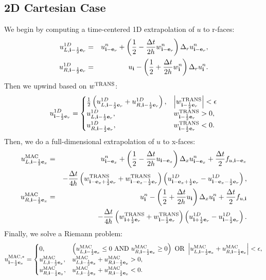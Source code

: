 \documentclass[11pt]{article}
\def\half  {\frac{1}{2}}
\def\dt    {\Delta t}
\def\mac   {\rm MAC}
\def\trans {\rm TRANS}
\def\eb    {{\bf e}}
\def\ib    {{\bf i}}
\begin{document}
\subsection{2D Cartesian Case}
We begin by computing a time-centered 1D extrapolation of $u$ to r-faces:
\begin{eqnarray}
u_{L,\ib-\half\eb_r}^{1D} &=& u_{\ib-\eb_r}^n + \left(\half - \frac{\dt}{2h}w_{\ib-\eb_r}^n\right)\Delta_r u_{\ib-\eb_r}^n, \\
u_{R,\ib-\half\eb_r}^{1D} &=& u_{\ib} - \left(\half + \frac{\dt}{2h}w_{\ib}^n\right)\Delta_r u_{\ib}^n.
\end{eqnarray}
Then we upwind based on $w^{\trans}$:
\begin{equation}
u_{\ib-\half\eb_r}^{1D} =
\begin{cases}
\half\left(u_{L,\ib-\half\eb_r}^{1D} + u_{R,\ib-\half\eb_r}^{1D}\right), & \left|w^{\trans}_{\ib-\half\eb_r}\right| < \epsilon \\
u_{L,\ib-\half\eb_r}^{1D}, & w^{\trans}_{\ib-\half\eb_r} > 0, \\
u_{R,\ib-\half\eb_r}^{1D}, & w^{\trans}_{\ib-\half\eb_r} < 0. \\
\end{cases}
\end{equation}
Then, we do a full-dimensional extrapolation of $u$ to x-faces:
\begin{eqnarray}
u_{L,\ib-\half\eb_x}^{\mac} &=& u_{\ib-\eb_x}^n + \left(\half - \frac{\dt}{2h}u_{\ib-\eb_x}\right)\Delta_x u_{\ib-\eb_x}^n + \frac{\dt}{2}f_{u,\ib-\eb_x} \nonumber \\
&& - \frac{\dt}{4h}\left(w_{\ib-\eb_x+\half\eb_r}^{\trans}+w_{\ib-\eb_x-\half\eb_r}^{\trans}\right)\left(u_{\ib-\eb_x+\half\eb_r}^{1D} - u_{\ib-\eb_x-\half\eb_r}^{1D}\right), \\
u_{R,\ib-\half\eb_x}^{\mac} &=& u_{\ib}^n - \left(\half + \frac{\dt}{2h}u_{\ib}\right)\Delta_x u_{\ib}^n + \frac{\dt}{2}f_{u,\ib} \nonumber \\
&& - \frac{\dt}{4h}\left(w_{\ib+\half\eb_r}^{\trans}+w_{\ib-\half\eb_r}^{\trans}\right)\left(u_{\ib+\half\eb_r}^{1D} - u_{\ib-\half\eb_r}^{1D}\right).
\end{eqnarray}
Finally, we solve a Riemann problem:
\begin{equation}
u_{\ib-\half\eb_x}^{\mac,*} =
\begin{cases}
0, & \left(u_{L,\ib-\half\eb_x}^{\mac} \le 0 ~ {\rm AND} ~ u_{R,\ib-\half\eb_x}^{\mac} \ge 0\right) ~ {\rm OR} ~ \left|u_{L,\ib-\half\eb_x}^{\mac} + u_{R,\ib-\half\eb_x}^{\mac}\right| < \epsilon, \\
u_{L,\ib-\half\eb_x}^{\mac}, & u_{L,\ib-\half\eb_x}^{\mac} + u_{R,\ib-\half\eb_x}^{\mac} > 0, \\
u_{R,\ib-\half\eb_x}^{\mac}, & u_{L,\ib-\half\eb_x}^{\mac} + u_{R,\ib-\half\eb_x}^{\mac} < 0. 
\end{cases}
\end{equation}
\end{document}
